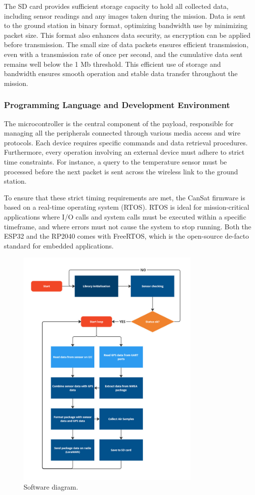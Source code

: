 The SD card provides sufficient storage capacity to hold all collected data, including sensor readings and any images taken during the mission. Data is sent to the ground station in binary format, optimizing bandwidth use by minimizing packet size. This format also enhances data security, as encryption can be applied before transmission. The small size of data packets ensures efficient transmission, even with a transmission rate of once per second, and the cumulative data sent remains well below the 1 Mb threshold. This efficient use of storage and bandwidth ensures smooth operation and stable data transfer throughout the mission.\textbf{}

\subsubsection{Programming Language and Development Environment}

The microcontroller is the central component of the payload, responsible for managing all the peripherals connected through various media access and wire protocols. Each device requires specific commands and data retrieval procedures. Furthermore, every operation involving an external device must adhere to strict time constraints. For instance, a query to the temperature sensor must be processed before the next packet is sent across the wireless link to the ground station.

To ensure that these strict timing requirements are met, the CanSat firmware is based on a real-time operating system (RTOS). RTOS is ideal for mission-critical applications where I/O calls and system calls must be executed within a specific timeframe, and where errors must not cause the system to stop running. Both the ESP32 and the RP2040 comes with FreeRTOS, which is the open-source de-facto standard for embedded applications.
\begin{figure}[htbp]
    \centering
    \includegraphics[width=9cm]{images/pdr/software diagram.jpg}
    \caption{\small{Software diagram.}}
    \label{fig:codeblocks}
\end{figure}

